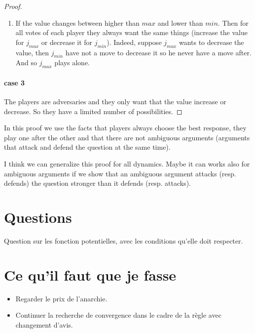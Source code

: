 \documentclass[12pt]{article}
\theoremstyle{defi}
\theoremstyle{not}
\theoremstyle{prob}
\begin{document}
\begin{proof}
\begin{enumerate}
          \item If the value changes between higher than $max$ and lower than $min$. Then for all votes of each player they always want the same things (increase the value for $j_{max}$ or decrease it for $j_{min}$). Indeed, suppose $j_{max}$ wants to decrease the value, then $j_{min}$ have not a move to decrease it so he never have a move after. And so $j_{max}$ plays alone.
        \end{enumerate}

        \paragraph{case 3}
          The players are adversaries and they only want that the value increase or decrease. So they have a limited number of possibilities.
      \end{proof}

      In this proof we use the facts that players always choose the best response, they play one after the other and that there are not ambiguous arguments (arguments that attack and defend the question at the same time).

      I think we can generalize this proof for all dynamics. Maybe it can works also for ambiguous arguments if we show that an ambiguous argument attacks (resp. defends) the question stronger than it defends (resp. attacks).
\color{black}
  \section{Questions}
  \color{blue}
  Question sur les fonction potentielles, avec les conditions qu'elle doit respecter.
\color{black}
  \section{Ce qu'il faut que je fasse}

    \begin{itemize}
      \item Regarder le prix de l'anarchie.
      \item Continuer la recherche de convergence dans le cadre de la règle avec changement d'avis.
    \end{itemize}
\end{document}
